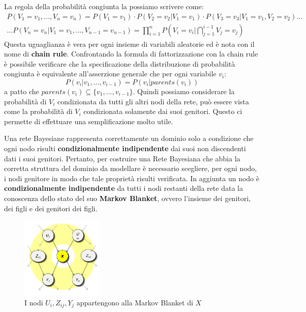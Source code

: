 La regola della probabilità congiunta la possiamo scrivere come:
\begin{equation*}
    \begin{aligned}
        P(V_1= v_1,...,V_n = v_n) = P(V_1 = v_1) \cdot P(V_2 = v_2|V_1 = v_1)
        \cdot P(V_3 = v_3|V_1 = v_1,V_2 = v_2) \dots \\
        \dots P(V_n = v_n|V_1 = v_1, \dots,V_{n-1}=v_{n-1}) = \prod_{i=1}^{n}
        P(V_i = v_i| \bigcap_{j = 1}^{i - 1} V_j= v_j)
    \end{aligned}
\end{equation*}
Questa uguaglianza è vera per ogni insieme di variabili aleatorie ed è nota con
il nome di \textbf{chain rule}. Confrontando la formula di fattorizzazione con
la chain rule è possibile verificare che la specificazione della distribuzione
di probabilità congiunta è equivalente all'asserzione generale che per ogni
variabile $v_i$:
\begin{equation}
    P(v_i|v_1,...,v_{i-1}) = P(v_i|parents(v_i))
\end{equation}
a patto che $parents(v_i) \subseteq \{v_1,...,v_{i-1}\}$. Quindi possiamo
considerare la probabilità di $V_i$ condizionata da tutti gli altri nodi della
rete, può essere vista come la probabilità di $V_i$ condizionata solamente dai
suoi genitori. Questo ci permette di effettuare una semplificazione molto utile.

Una rete Bayesiane rappresenta correttamente un dominio solo a condizione che ogni
nodo risulti \textbf{condizionalmente indipendente} dai suoi non discendenti
dati i suoi genitori. Pertanto, per costruire una Rete Bayesiana che abbia la
corretta struttura del dominio da modellare è necessario scegliere, per ogni nodo,
i nodi genitore in modo che tale proprietà risulti verificata. In aggiunta un nodo
è \textbf{condizionalmente indipendente} da tutti i nodi restanti della rete data
la conoscenza dello stato del suo \textbf{Markov Blanket}, ovvero l'insieme dei
genitori, dei figli e dei genitori dei figli.
\begin{figure}[!ht]
    \centering
    \includegraphics[width=0.35\textwidth]{./img/Reti/MarkovBlanket.png}
    \caption{I nodi $U_i, Z_{ij}, Y_j$ appartengono alla Markov Blanket di $X$}
    \label{fig:MarkovBlanket}
\end{figure}

